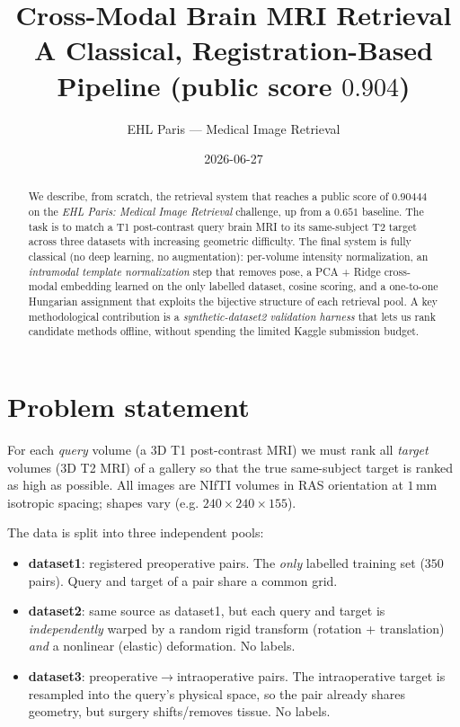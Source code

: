 \documentclass[11pt]{article}
\title{\textbf{Cross-Modal Brain MRI Retrieval}\\[2pt]
\large A Classical, Registration-Based Pipeline (public score $0.904$)}
\author{EHL Paris --- Medical Image Retrieval}
\date{2026-06-27}
\begin{document}
\maketitle

\begin{abstract}
We describe, from scratch, the retrieval system that reaches a public score of
$0.90444$ on the \emph{EHL Paris: Medical Image Retrieval} challenge, up from a
$0.651$ baseline. The task is to match a T1 post-contrast query brain MRI to its
same-subject T2 target across three datasets with increasing geometric difficulty.
The final system is fully classical (no deep learning, no augmentation): per-volume
intensity normalization, an \emph{intramodal template normalization} step that
removes pose, a PCA + Ridge cross-modal embedding learned on the only labelled
dataset, cosine scoring, and a one-to-one Hungarian assignment that exploits the
bijective structure of each retrieval pool. A key methodological contribution is a
\emph{synthetic-dataset2 validation harness} that lets us rank candidate methods
offline, without spending the limited Kaggle submission budget.
\end{abstract}

\tableofcontents

\section{Problem statement}

For each \emph{query} volume (a 3D T1 post-contrast MRI) we must rank all
\emph{target} volumes (3D T2 MRI) of a gallery so that the true same-subject target
is ranked as high as possible. All images are NIfTI volumes in RAS orientation at
$1\,\text{mm}$ isotropic spacing; shapes vary (e.g. $240\times240\times155$).

The data is split into three independent pools:
\begin{itemize}[nosep]
  \item \textbf{dataset1}: registered preoperative pairs. The \emph{only} labelled
        training set ($350$ pairs). Query and target of a pair share a common grid.
  \item \textbf{dataset2}: same source as dataset1, but each query and target is
        \emph{independently} warped by a random rigid transform (rotation +
        translation) \emph{and} a nonlinear (elastic) deformation. No labels.
  \item \textbf{dataset3}: preoperative$\to$intraoperative pairs. The intraoperative
        target is resampled into the query's physical space, so the pair already
        shares geometry, but surgery shifts/removes tissue. No labels.
\end{itemize}
\end{document}
